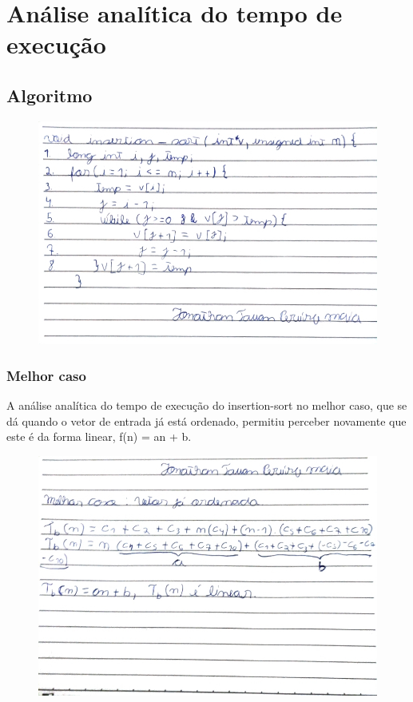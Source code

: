 \newpage

\section{Análise analítica do tempo de execução}

\subsection{Algoritmo}
\begin{figure}[h]
    \centering
    \includegraphics[width=0.76\linewidth]{Imagens/insertion.jpg}
\end{figure}

\newpage

\subsubsection{Melhor caso}
A análise analítica do tempo de execução do insertion-sort no melhor caso, que se dá quando o vetor de entrada já está ordenado, permitiu perceber novamente que este é da forma linear, f(n) = an + b.
\begin{figure}[h]
    \centering
    \includegraphics[width=0.76\linewidth]{Imagens/melhor-insertion.jpg}
\end{figure}

